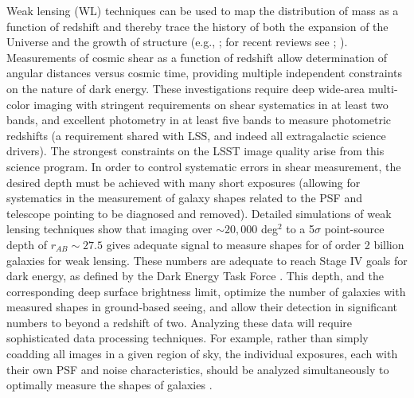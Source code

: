 Weak lensing (WL) techniques can be used to map the distribution of
mass as a function of redshift and thereby trace the history of both
the expansion of the Universe and the growth of structure (e.g., \citealt{1999ApJ...514L..65H};
for recent reviews see \citealt{2015RPPh...78h6901K}; \citealt{2017arXiv171003235M}).  Measurements of cosmic shear as a function of
redshift allow determination of angular distances versus cosmic time,
providing multiple independent constraints on the nature of dark
energy.  These investigations require deep wide-area multi-color
imaging with stringent requirements on shear systematics in at least
two bands, and excellent photometry in at least five bands to measure
photometric redshifts (a requirement shared with LSS, and indeed all
extragalactic science drivers). The strongest constraints on the LSST
image quality arise from this science program. In order to control
systematic errors in shear measurement, the desired depth must be
achieved with many short exposures (allowing for systematics in the
measurement of galaxy shapes related
to the PSF and telescope pointing to be diagnosed and removed). Detailed simulations of
weak lensing techniques show that imaging over $\sim20,000$ deg$^2$ to
a 5$\sigma$ point-source depth of $r_{AB} \sim 27.5$ gives adequate
signal to measure shapes for of order 2 billion galaxies for weak
lensing.  These numbers are adequate to reach
Stage IV goals for dark energy, as defined by the Dark Energy Task
Force \citep{2006astro.ph..9591A}.
This
depth, and the corresponding deep surface brightness limit,
optimize the number of galaxies with measured shapes in ground-based
seeing, and allow their detection in significant numbers to beyond a
redshift of two.  Analyzing these data will
require sophisticated data processing techniques.  For example, rather
than simply coadding all images in a given region of sky, the
individual exposures, each with their own PSF and noise
characteristics,  should be analyzed simultaneously to optimally
measure the shapes of galaxies \citep{2008ASPC..394..107T,2011PASP..123..596J}.

